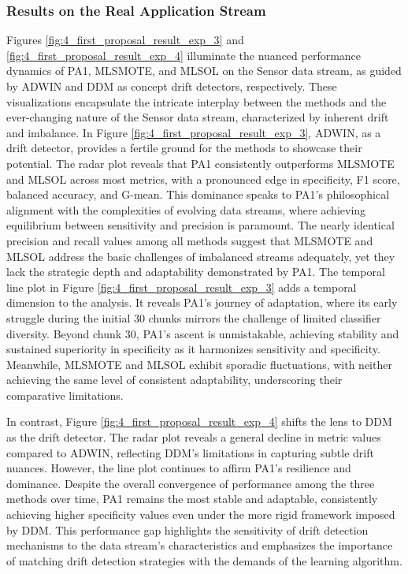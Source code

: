 \subsubsection{Results on the Real Application Stream}
Figures \ref{fig:4_first_proposal_result_exp_3} and \ref{fig:4_first_proposal_result_exp_4} illuminate the nuanced performance dynamics of PA1, MLSMOTE, and MLSOL on the Sensor data stream, as guided by ADWIN and DDM as concept drift detectors, respectively. These visualizations encapsulate the intricate interplay between the methods and the ever-changing nature of the Sensor data stream, characterized by inherent drift and imbalance. In Figure \ref{fig:4_first_proposal_result_exp_3}, ADWIN, as a drift detector, provides a fertile ground for the methods to showcase their potential. The radar plot reveals that PA1 consistently outperforms MLSMOTE and MLSOL across most metrics, with a pronounced edge in specificity, F1 score, balanced accuracy, and G-mean. This dominance speaks to PA1’s philosophical alignment with the complexities of evolving data streams, where achieving equilibrium between sensitivity and precision is paramount. The nearly identical precision and recall values among all methods suggest that MLSMOTE and MLSOL address the basic challenges of imbalanced streams adequately, yet they lack the strategic depth and adaptability demonstrated by PA1. The temporal line plot in Figure \ref{fig:4_first_proposal_result_exp_3} adds a temporal dimension to the analysis. It reveals PA1’s journey of adaptation, where its early struggle during the initial 30 chunks mirrors the challenge of limited classifier diversity. Beyond chunk 30, PA1’s ascent is unmistakable, achieving stability and sustained superiority in specificity as it harmonizes sensitivity and specificity. Meanwhile, MLSMOTE and MLSOL exhibit sporadic fluctuations, with neither achieving the same level of consistent adaptability, underscoring their comparative limitations.

In contrast, Figure \ref{fig:4_first_proposal_result_exp_4} shifts the lens to DDM as the drift detector. The radar plot reveals a general decline in metric values compared to ADWIN, reflecting DDM’s limitations in capturing subtle drift nuances. However, the line plot continues to affirm PA1’s resilience and dominance. Despite the overall convergence of performance among the three methods over time, PA1 remains the most stable and adaptable, consistently achieving higher specificity values even under the more rigid framework imposed by DDM. This performance gap highlights the sensitivity of drift detection mechanisms to the data stream's characteristics and emphasizes the importance of matching drift detection strategies with the demands of the learning algorithm.

